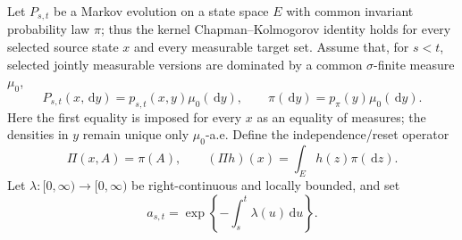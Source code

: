 \documentclass[11pt]{article}
\theoremstyle{remark}
\newcommand{\dd}{\,\mathrm d}
\begin{document}
Let $P_{s,t}$ be a Markov evolution on a state space $E$ with common invariant
probability law $\pi$; thus the kernel Chapman--Kolmogorov identity holds for
every selected source state $x$ and every measurable target set.  Assume that,
for $s<t$, selected jointly measurable versions are dominated by a common
$\sigma$-finite measure $\mu_0$,
\[
P_{s,t}(x,\dd y)=p_{s,t}(x,y)\mu_0(\dd y),
\qquad \pi(\dd y)=p_\pi(y)\mu_0(\dd y).
\]
Here the first equality is imposed for every $x$ as an equality of measures;
the densities in $y$ remain unique only $\mu_0$-a.e.
Define the independence/reset operator
\begin{equation}
\Pi(x,A)=\pi(A),\qquad (\Pi h)(x)=\int_Eh(z)\pi(\dd z).
\label{rev:reset-kernel}
\end{equation}
Let $\lambda:[0,\infty)\to[0,\infty)$ be right-continuous and locally bounded,
and set
\begin{equation}
a_{s,t}=\exp\!\left\{-\int_s^t\lambda(u)\dd u\right\}.
\label{rev:survival-weight}
\end{equation}
\end{document}
